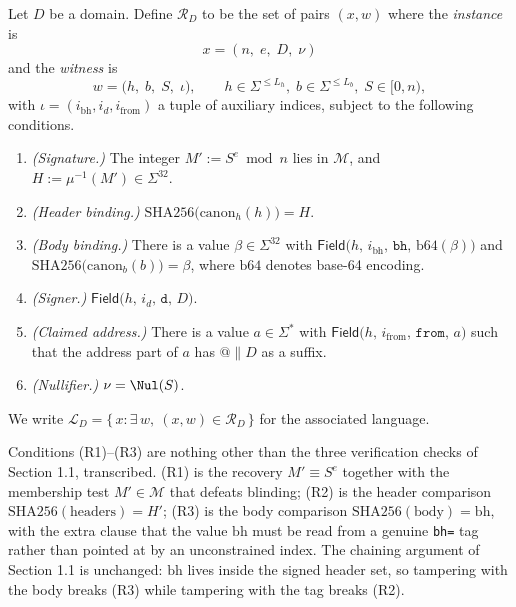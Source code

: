 \documentclass[12pt,reqno]{amsart}
\theoremstyle{definition}
\newcommand{\cM}{\mathcal{M}}
\newcommand{\cL}{\mathcal{L}}
\newcommand{\cR}{\mathcal{R}}
\newcommand{\sha}{\mathrm{SHA256}}
\newcommand{\canon}{\mathrm{canon}}
\newcommand{\Field}{\mathsf{Field}}
\begin{document}
\begin{definition}
\label{def:relation}
Let $D$ be a domain. Define $\cR_{D}$ to be the set of pairs $(x, w)$ where the
\emph{instance} is
\[
  x = (n,\; e,\; D,\; \nu)
\]
and the \emph{witness} is
\[
  w = \bigl(h,\; b,\; S,\; \iota\bigr),
  \qquad h \in \Sigma^{\le L_{h}},\; b \in \Sigma^{\le L_{b}},\;
  S \in [0, n),
\]
with $\iota = (i_{\mathrm{bh}}, i_{d}, i_{\mathrm{from}})$ a tuple of auxiliary
indices, subject to the following conditions.
 
\begin{enumerate}
\item[(R1)] \emph{(Signature.)} The integer $M' := S^{e} \bmod n$ lies in
  $\cM$, and $H := \mu^{-1}(M') \in \Sigma^{32}$.
 
\item[(R2)] \emph{(Header binding.)}
  $\sha\bigl(\canon_{h}(h)\bigr) = H$.
 
\item[(R3)] \emph{(Body binding.)} There is a value $\beta \in \Sigma^{32}$ with
  $\Field\bigl(h,\, i_{\mathrm{bh}},\, \texttt{bh},\, \mathrm{b64}(\beta)\bigr)$
  and
  $\sha\bigl(\canon_{b}(b)\bigr) = \beta$,
  where $\mathrm{b64}$ denotes base-64 encoding.
 
\item[(R4)] \emph{(Signer.)}
  $\Field\bigl(h,\, i_{d},\, \texttt{d},\, D\bigr)$.
 
\item[(R5)] \emph{(Claimed address.)} There is a value $a \in \Sigma^{*}$ with
  $\Field\bigl(h,\, i_{\mathrm{from}},\, \texttt{from},\, a\bigr)$ such that the
  address part of $a$ has $\texttt{@} \| D$ as a suffix.
 
\item[(R6)] \emph{(Nullifier.)} $\nu = \Nul(S)$.
\end{enumerate}
We write $\cL_{D} = \{\, x : \exists\, w,\ (x,w) \in \cR_{D} \,\}$ for the
associated language.
\end{definition}
 
Conditions (R1)--(R3) are nothing other than the three verification checks of
Section 1.1, transcribed. (R1) is the recovery $M' \equiv S^{e}$ together with
the membership test $M' \in \cM$ that defeats blinding; (R2) is the header
comparison $\sha(\text{headers}) = H'$; (R3) is the body comparison
$\sha(\text{body}) = \mathrm{bh}$, with the extra clause that the value
$\mathrm{bh}$ must be read from a genuine \texttt{bh=} tag rather than pointed at
by an unconstrained index. The chaining argument of Section 1.1 is unchanged:
$\mathrm{bh}$ lives inside the signed header set, so tampering with the body
breaks (R3) while tampering with the tag breaks (R2).
 
\end{document}
